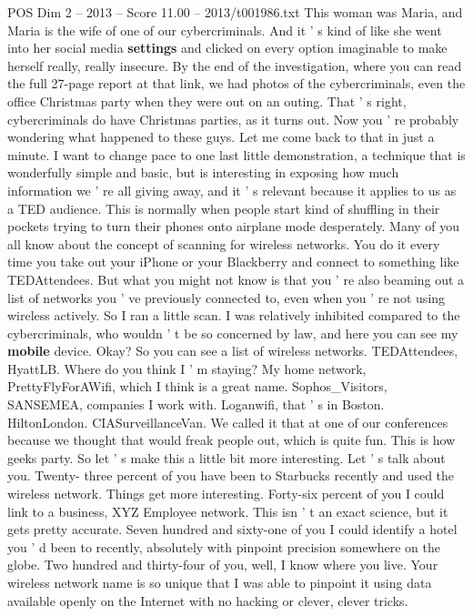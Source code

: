 \begin{textsample}{POS Dim 2 – 2013 – Score 11.00 – 2013/t001986.txt}
This woman was Maria, and Maria is the wife of one of our cybercriminals.
And it ' s kind of like she went into her social media \textbf{settings} and clicked on every option imaginable to make herself really, really insecure.
By the end of the investigation, where you can read the full 27-page report at that link, we had photos of the cybercriminals, even the office Christmas party when they were out on an outing.
That ' s right, cybercriminals do have Christmas parties, as it turns out.
Now you ' re probably wondering what happened to these guys.
Let me come back to that in just a minute.
I want to change pace to one last little demonstration, a technique that is wonderfully simple and basic, but is interesting in exposing how much information we ' re all giving away, and it ' s relevant because it applies to us as a TED audience.
This is normally when people start kind of shuffling in their pockets trying to turn their phones onto airplane mode desperately.
Many of you all know about the concept of scanning for wireless networks.
You do it every time you take out your iPhone or your Blackberry and connect to something like TEDAttendees.
But what you might not know is that you ' re also beaming out a list of networks you ' ve previously connected to, even when you ' re not using wireless actively.
So I ran a little scan.
I was relatively inhibited compared to the cybercriminals, who wouldn ' t be so concerned by law, and here you can see my \textbf{mobile} device.
Okay?
So you can see a list of wireless networks.
TEDAttendees, HyattLB.
Where do you think I ' m staying?
My home network, PrettyFlyForAWifi, which I think is a great name.
Sophos\_Visitors, SANSEMEA, companies I work with.
Loganwifi, that ' s in Boston.
HiltonLondon.
CIASurveillanceVan.
We called it that at one of our conferences because we thought that would freak people out, which is quite fun.
This is how geeks party.
So let ' s make this a little bit more interesting.
Let ' s talk about you.
Twenty- three percent of you have been to Starbucks recently and used the wireless network.
Things get more interesting.
Forty-six percent of you I could link to a business, XYZ Employee network.
This isn ' t an exact science, but it gets pretty accurate.
Seven hundred and sixty-one of you I could identify a hotel you ' d been to recently, absolutely with pinpoint precision somewhere on the globe.
Two hundred and thirty-four of you, well, I know where you live.
Your wireless network name is so unique that I was able to pinpoint it using data available openly on the Internet with no hacking or clever, clever tricks.

\end{textsample}
